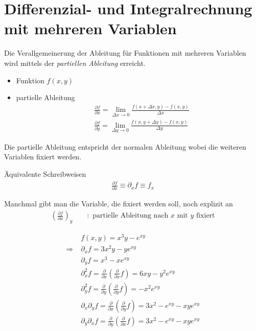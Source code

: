 \section{Differenzial- und Integralrechnung mit mehreren Variablen}
Die Verallgemeinerung der Ableitung für Funktionen mit mehreren Variablen wird mittels der {\em partiellen Ableitung} erreicht.
\begin{itemize}
  \item Funktion $f(x,y)$
  \item partielle Ableitung
  \begin{align*}
&\frac{\partial f}{\partial x} = \lim \limits_{\Delta x\to0} \frac{f(x+\Delta x, y) - f(x,y)}{\Delta x}\\
&\frac{\partial f}{\partial y} = \lim \limits_{\Delta y\to0} \frac{f(x, y+\Delta y) - f(x,y)}{\Delta y}
\end{align*}
\end{itemize}

Die partielle Ableitung entspricht der normalen Ableitung wobei die weiteren Variablen fixiert werden.

\begin{Bemerkung}
Äquivalente Schreibweisen
  \begin{align*}
\frac{\partial f}{\partial x} \equiv \partial_x f \equiv f_x
\end{align*}
\end{Bemerkung}

Manchmal gibt man die Variable, die fixiert werden soll, noch explizit an
\begin{align*}
\left(\frac{\partial f}{\partial x}\right)_y \qquad : \text{ partielle
Ableitung nach $x$ mit $y$ fixiert}
\end{align*}

\begin{Beispiel}
\begin{align*}
& f(x,y) = x^3y - e^{xy}\\
\Rightarrow\; & \partial_x f = 3x^2y - ye^{xy}\\
&\partial_y f = x^3 - xe^{xy}\\
&\partial^2_x f = \frac{\partial}{\partial x}\left( \frac{\partial}{\partial x}f\right) = 6xy - y^2e^{xy}\\
&\partial^2_y f = \frac{\partial}{\partial y}\left( \frac{\partial}{\partial y}f\right) =-x^2e^{xy}\\
&\partial_x\partial_y f = \frac{\partial}{\partial x}\left(\frac{\partial}{\partial y}f\right) = 3x^2 - e^{xy} - xye^{xy}\\
&\partial_y\partial_x f = \frac{\partial}{\partial y}\left(\frac{\partial}{\partial x}f\right) = 3x^2 - e^{xy} - xye^{xy}\\
\end{align*}
\end{Beispiel}

